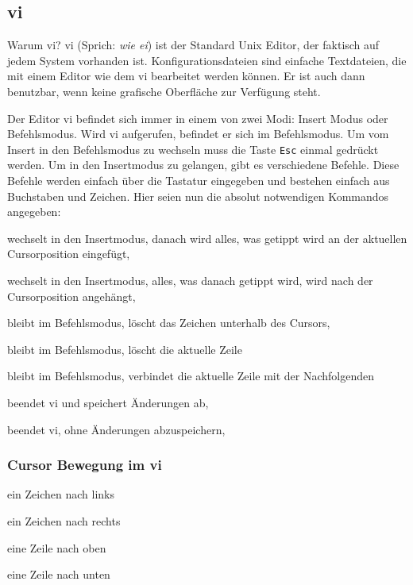 \documentclass[titlepage,a4paper]{article}
\begin{document}
\subsection{vi}
\label{sec:vi}

Warum vi?  vi (Sprich: \emph{wie ei}) ist der Standard Unix Editor, der
faktisch auf jedem System vorhanden ist.  Konfigurationsdateien sind einfache
Textdateien, die mit einem Editor wie dem vi bearbeitet werden können.  Er
ist auch dann benutzbar, wenn keine grafische Oberfläche zur Verfügung steht.

Der Editor vi befindet sich immer in einem von zwei Modi: Insert Modus oder
Befehlsmodus.  Wird vi aufgerufen, befindet er sich im Befehlsmodus.
Um vom Insert in den Befehlsmodus zu wechseln muss die Taste
\texttt{Esc} einmal gedrückt werden.  Um in den Insertmodus zu gelangen, gibt
es verschiedene Befehle.  Diese Befehle werden einfach über die Tastatur
eingegeben und bestehen einfach aus Buchstaben und Zeichen.
Hier seien nun die absolut notwendigen Kommandos
angegeben: 

\begin{description}
\setlength{\itemsep}{0pt}
\item[i] wechselt in den Insertmodus, danach wird alles, was getippt wird
  an der aktuellen Cursorposition eingefügt,
\item[a] wechselt in den Insertmodus, alles, was danach getippt wird, wird
  nach der Cursorposition angehängt,
\item[x] bleibt im Befehlsmodus, löscht das Zeichen unterhalb des Cursors,
\item[dd] bleibt im Befehlsmodus, löscht die aktuelle Zeile
\item[J] bleibt im Befehlsmodus, verbindet die aktuelle Zeile mit der
  Nachfolgenden
\item[ZZ] beendet vi und speichert Änderungen ab,
\item[:q!] beendet vi, ohne Änderungen abzuspeichern,
\end{description}

\subsubsection*{Cursor Bewegung im vi}

\begin{description}
\setlength{\itemsep}{0pt}
\item[h] ein Zeichen nach links
\item[l] ein Zeichen nach rechts
\item[k] eine Zeile nach oben
\item[j] eine Zeile nach unten
\end{description}
\end{document}
